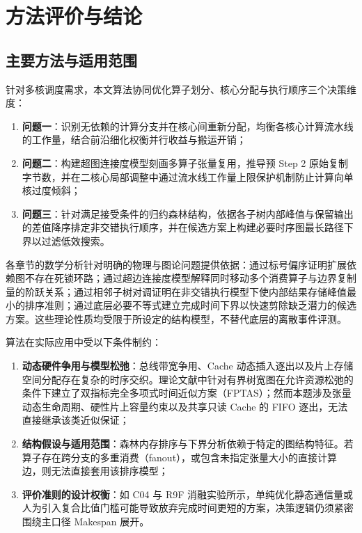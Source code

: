 \documentclass[anonymous,withtoc]{gmcm2026}
\providecommand{\tightlist}{\setlength{\itemsep}{0pt}\setlength{\parskip}{0pt}}
\begin{document}
\section{方法评价与结论}

\subsection{主要方法与适用范围}

针对多核调度需求，本文算法协同优化算子划分、核心分配与执行顺序三个决策维度：

\begin{enumerate}
\def\labelenumi{\arabic{enumi}.}
\tightlist
\item
  \textbf{问题一}：识别无依赖的计算分支并在核心间重新分配，均衡各核心计算流水线的工作量，结合前沿细化权衡并行收益与搬运开销；
\item
  \textbf{问题二}：构建超图连接度模型刻画多算子张量复用，推导预 Step 2 原始复制字节数，并在二核心局部调整中通过流水线工作量上限保护机制防止计算向单核过度倾斜；
\item
  \textbf{问题三}：针对满足接受条件的归约森林结构，依据各子树内部峰值与保留输出的差值降序排定非交错执行顺序，并在候选方案上构建必要时序图最长路径下界以过滤低效搜索。
\end{enumerate}

各章节的数学分析针对明确的物理与图论问题提供依据：通过标号偏序证明扩展依赖图不存在死锁环路；通过超边连接度模型解释同时移动多个消费算子与边界复制量的阶跃关系；通过相邻子树对调证明在非交错执行模型下使内部结果存储峰值最小的排序准则；通过底层必要不等式建立完成时间下界以快速剪除缺乏潜力的候选方案。这些理论性质均受限于所设定的结构模型，不替代底层的离散事件评测。

算法在实际应用中受以下条件制约：

\begin{enumerate}
\def\labelenumi{\arabic{enumi}.}
\tightlist
\item
  \textbf{动态硬件争用与模型松弛}：总线带宽争用、Cache 动态插入逐出以及片上存储空间分配存在复杂的时序交织。理论文献中针对有界树宽图在允许资源松弛的条件下建立了双指标完全多项式时间近似方案（FPTAS）\cite{ref11}；然而本题涉及张量动态生命周期、硬性片上容量约束以及共享只读 Cache 的 FIFO 逐出，无法直接继承该类近似保证；
\item
  \textbf{结构假设与适用范围}：森林内存排序与下界分析依赖于特定的图结构特征。若算子存在跨分支的多重消费（fanout），或包含未指定张量大小的直接计算边，则无法直接套用该排序模型；
\item
  \textbf{评价准则的设计权衡}：如 C04 与 R9F 消融实验所示，单纯优化静态通信量或人为引入复合比值门槛可能导致放弃完成时间更短的方案，决策逻辑仍须紧密围绕主口径 Makespan 展开。
\end{enumerate}
\end{document}
